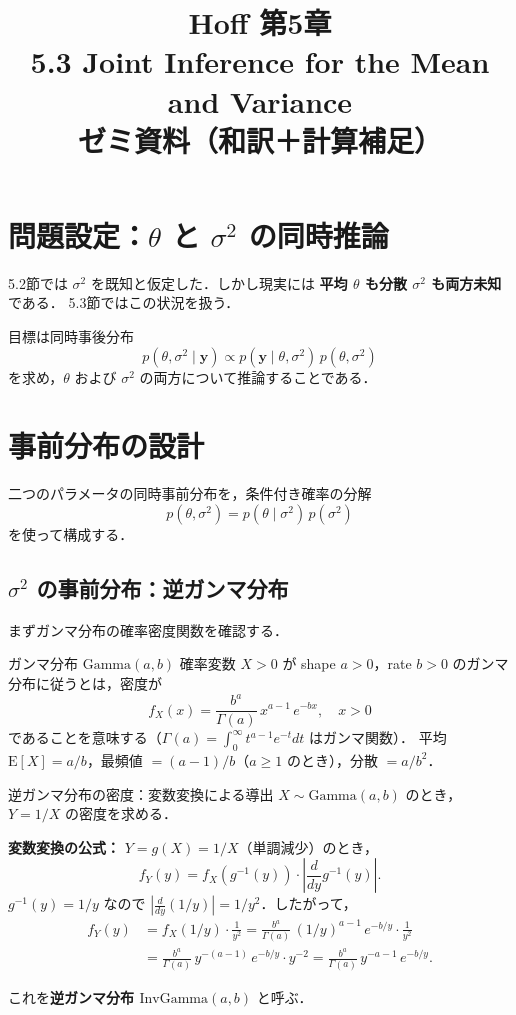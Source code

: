 \documentclass[lualatex,ja=standard,a4paper,12pt]{bxjsarticle}
\title{{\large Hoff 第5章} \\[6pt]
       \textbf{5.3\; Joint Inference for the Mean and Variance} \\[4pt]
       {\normalsize ゼミ資料（和訳＋計算補足）}}
\author{}
\date{}
\begin{document}
\maketitle
\thispagestyle{empty}

\section{問題設定：$\theta$ と $\sigma^2$ の同時推論}

5.2節では $\sigma^2$ を既知と仮定した．しかし現実には
\textbf{平均 $\theta$ も分散 $\sigma^2$ も両方未知}である．
5.3節ではこの状況を扱う．

目標は同時事後分布
\[
  p(\theta, \sigma^2 \mid \mathbf{y})
  \propto p(\mathbf{y} \mid \theta, \sigma^2)\, p(\theta, \sigma^2)
\]
を求め，$\theta$ および $\sigma^2$ の両方について推論することである．

\section{事前分布の設計}

二つのパラメータの同時事前分布を，条件付き確率の分解
\[
  p(\theta, \sigma^2) = p(\theta \mid \sigma^2)\, p(\sigma^2)
\]
を使って構成する．

\subsection{$\sigma^2$ の事前分布：逆ガンマ分布}

まずガンマ分布の確率密度関数を確認する．

\begin{defbox}{ガンマ分布 $\mathrm{Gamma}(a, b)$}
確率変数 $X > 0$ が shape $a > 0$，rate $b > 0$ のガンマ分布に従うとは，密度が
\[
  f_X(x) = \frac{b^a}{\Gamma(a)}\, x^{a-1}\, e^{-bx}, \quad x > 0
\]
であることを意味する（$\Gamma(a) = \int_0^\infty t^{a-1}e^{-t}dt$ はガンマ関数）．
平均 $\mathrm{E}[X] = a/b$，最頻値 $= (a-1)/b$（$a \geq 1$ のとき），分散 $= a/b^2$．
\end{defbox}

\begin{derivbox}{逆ガンマ分布の密度：変数変換による導出}
$X \sim \mathrm{Gamma}(a, b)$ のとき，$Y = 1/X$ の密度を求める．

\medskip
\noindent\textbf{変数変換の公式：}
$Y = g(X) = 1/X$（単調減少）のとき，
\[
  f_Y(y) = f_X\!\left(g^{-1}(y)\right) \cdot \left|\frac{d}{dy}g^{-1}(y)\right|.
\]
$g^{-1}(y) = 1/y$ なので $\left|\frac{d}{dy}(1/y)\right| = 1/y^2$．したがって，
\begin{align*}
  f_Y(y)
  &= f_X(1/y) \cdot \frac{1}{y^2}
   = \frac{b^a}{\Gamma(a)}\,(1/y)^{a-1}\,e^{-b/y} \cdot \frac{1}{y^2} \\[4pt]
  &= \frac{b^a}{\Gamma(a)}\, y^{-(a-1)}\, e^{-b/y} \cdot y^{-2}
   = \frac{b^a}{\Gamma(a)}\, y^{-a-1}\, e^{-b/y}.
\end{align*}

\noindent これを\textbf{逆ガンマ分布 $\mathrm{InvGamma}(a, b)$} と呼ぶ．
\end{derivbox}
\end{document}
